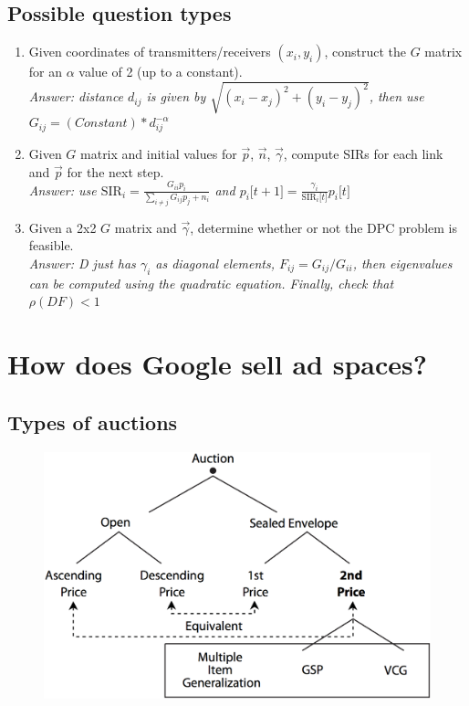 \documentclass{article}
\newcommand{\MatrixVariable}[1]{\bm{\mathit{#1}}}
\begin{document}
\subsection{Possible question types}

\begin{enumerate}
\item Given coordinates of transmitters/receivers $(x_i, y_i)$, construct the $\MatrixVariable{G}$ matrix for an $\alpha$ value of 2 (up to a constant). \\
\textit{Answer: distance $d_{ij}$ is given by $\sqrt{(x_i-x_j)^2+(y_i-y_j)^2}$, then use $G_{ij} = (Constant)*d_{ij}^{-\alpha}$}
\item Given $\MatrixVariable{G}$ matrix and initial values for $\vec p$, $\vec n$, $\vec \gamma$, compute SIRs for each link and $\vec p$ for the next step. \\
\textit{Answer: use $\text{SIR}_i = \frac{G_{ii}p_i}{\sum_{i \neq j} G_{ij}p_j + n_i}$ and $p_i\lbrack t+1 \rbrack = \frac{\gamma_i}{\text{SIR}_i \lbrack t \rbrack} p_i \lbrack t \rbrack$}
\item Given a 2x2 $\MatrixVariable{G}$ matrix and $\vec \gamma$, determine whether or not the DPC problem is feasible. \\
\textit{Answer: D just has $\gamma_i$ as diagonal elements, $F_{ij} = G_{ij}/G_{ii}$, then eigenvalues can be computed using the quadratic equation. Finally, check that $\rho(\MatrixVariable{DF}) < 1$}
\end{enumerate}

\clearpage

\section{How does Google sell ad spaces?}

\subsection{Types of auctions}

\begin{figure}
\includegraphics[width=\linewidth]{auctions.png}
\end{figure}
\end{document}
